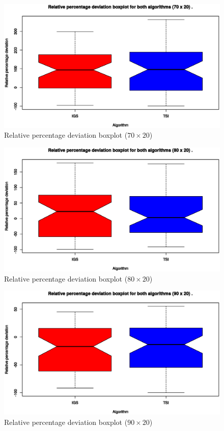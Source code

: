 \begin{figure}[H]
	\centering
	\includegraphics[width=\textwidth]{fig/box/70x20}
	\caption{Relative percentage deviation boxplot ($70 \times 20$)}
\end{figure}

\begin{figure}[H]
	\centering
	\includegraphics[width=\textwidth]{fig/box/80x20}
	\caption{Relative percentage deviation boxplot ($80 \times 20$)}
\end{figure}

\begin{figure}[H]
	\centering
	\includegraphics[width=\textwidth]{fig/box/90x20}
	\caption{Relative percentage deviation boxplot ($90 \times 20$)}
\end{figure}